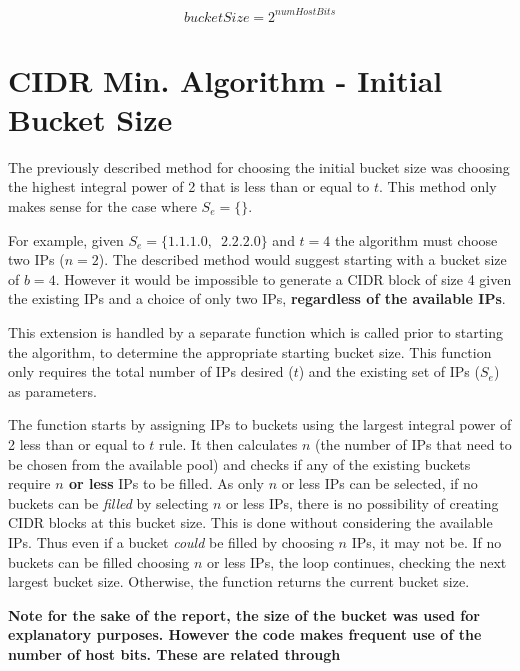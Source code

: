 \begin{appendices}
\begin{equation}\label{eq:bucketSizeHostBits}
bucketSize = 2^{numHostBits}
\end{equation}
\vfill




\chapter{CIDR Min. Algorithm - Initial Bucket Size}
\label{appendix:smartInitBucket}
The previously described method for choosing the initial bucket size was choosing the highest integral power of 2 that is less than or equal to $t$. This method only makes sense for the case where $S_e = \{\}$. 

For example, given $S_e = \{1.1.1.0,\enspace2.2.2.0\}$ and $t = 4$ the algorithm must choose two IPs ($n = 2$). The described method would suggest starting with a bucket size of $b=4$. However it would be impossible to generate a CIDR block of size 4 given the existing IPs and a choice of only two IPs, \textbf{regardless of the available IPs}. 

This extension is handled by a separate function which is called prior to starting the algorithm, to determine the appropriate starting bucket size. This function only requires the total number of IPs desired ($t$) and the existing set of IPs ($S_e$) as parameters. 

The function starts by assigning IPs to buckets using the largest integral power of 2 less than or equal to $t$ rule. It then calculates $n$ (the number of IPs that need to be chosen from the available pool) and checks if any of the existing buckets require \textbf{$n$ or less} IPs to be filled. As only $n$ or less IPs can be selected, if no buckets can be \textit{filled} by selecting $n$ or less IPs, there is no possibility of creating CIDR blocks at this bucket size. This is done without considering the available IPs. Thus even if a bucket \textit{could} be filled by choosing $n$ IPs, it may not be. If no buckets can be filled choosing $n$ or less IPs, the loop continues, checking the next largest bucket size. Otherwise, the function returns the current bucket size.

\textbf{Note for the sake of the report, the size of the bucket was used for explanatory purposes. However the code makes frequent use of the number of host bits. These are related through }


\end{appendices}
